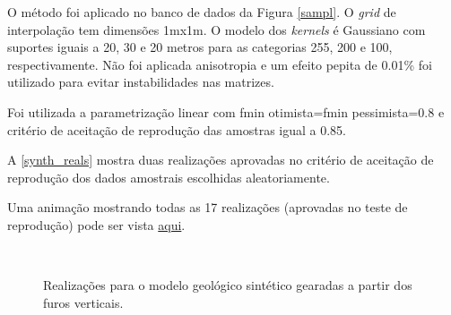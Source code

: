 O método foi aplicado no banco de dados da Figura \autoref{sampl}. O \textit{grid} de interpolação tem dimensões 1mx1m. O modelo dos \textit{kernels} é Gaussiano com suportes iguais a 20, 30 e 20 metros para as categorias 255, 200 e 100, respectivamente. Não foi aplicada anisotropia e um efeito pepita de 0.01\% foi utilizado para evitar instabilidades nas matrizes.

Foi utilizada a parametrização linear com fmin otimista=fmin pessimista=0.8 e critério de aceitação de reprodução das amostras igual a 0.85.

A \autoref{synth_reals} mostra duas realizações aprovadas no critério de aceitação de reprodução dos dados amostrais escolhidas aleatoriamente.

Uma animação mostrando todas as 17 realizações (aprovadas no teste de reprodução) pode ser vista \href{https://github.com/robertorolo/kernel_support_parametrization_uncertainty_assess/blob/main/sec_hole_10.gif}{aqui}.

\begin{figure}[H] 
    \centering
    \caption{Realizações para o modelo geológico sintético gearadas a partir dos furos verticais.} \label{synth_reals}
     \\
\end{figure}

